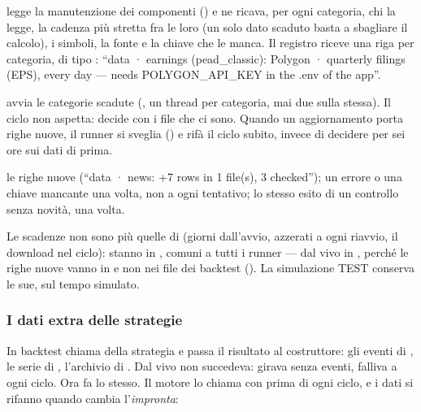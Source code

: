 \begin{description}[leftmargin = 1.4em, style = nextline, itemsep = 4pt]
  \item[All'avvio, il piano]  legge la manutenzione dei
    componenti () e ne ricava, per ogni categoria,
    chi la legge, la cadenza più stretta fra le loro (un solo dato scaduto
    basta a sbagliare il calcolo), i simboli, la fonte e la chiave che le
    manca. Il registro riceve una riga per categoria, di tipo
    : \enquote{data · earnings (pead\_classic): Polygon ·
    quarterly filings (EPS), every day --- needs POLYGON\_API\_KEY in the
    .env of the app}.
  \item[A ogni giro, in sottofondo]  avvia le categorie
    scadute (, un thread per categoria, mai due
    sulla stessa). Il ciclo non aspetta: decide con i file che ci sono.
    Quando un aggiornamento porta righe nuove, il runner si sveglia
    () e rifà il ciclo subito, invece di decidere per sei
    ore sui dati di prima.
  \item[Nel registro] le righe nuove (\enquote{data · news: +7 rows in 1
    file(s), 3 checked}); un errore o una chiave mancante una volta, non a ogni
    tentativo; lo stesso esito di un controllo senza novità, una volta.
\end{description}

\noindent
Le scadenze non sono più quelle di  (giorni dall'avvio,
azzerati a ogni riavvio, il download nel ciclo): stanno in
, comuni a tutti i runner --- dal vivo in
, perché le righe nuove vanno in
 e non nei file dei backtest (). La
simulazione TEST conserva le sue, sul tempo simulato.

\subsubsection{I dati extra delle strategie}

In backtest  chiama 
della strategia e passa il risultato al costruttore: gli eventi di
, le serie di , l'archivio di
. Dal vivo non succedeva:  girava
senza eventi,  falliva a ogni ciclo. Ora
 fa lo stesso. Il motore lo chiama con
 prima di ogni ciclo, e i dati si rifanno
quando cambia l'\emph{impronta}:

